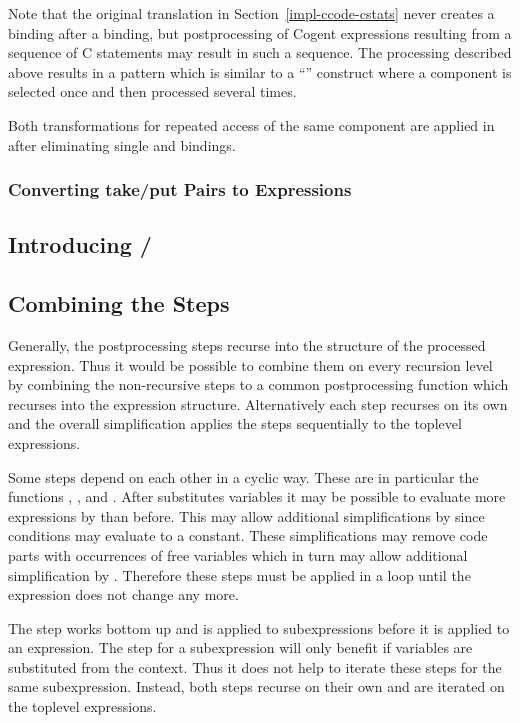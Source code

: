 Note that the original translation in Section~\ref{impl-ccode-cstats} never creates a  binding after a  binding, 
but postprocessing of Cogent expressions resulting from a sequence of C statements may result in such a sequence. The processing
described above results in a pattern which is similar to a ``'' construct where a component is selected once and then
processed several times.

Both transformations for repeated access of the same component are applied in  after eliminating single 
and  bindings.

\subsubsection{Converting take/put Pairs to  Expressions}

\subsection{Introducing /}
\label{impl-post-ref}


\subsection{Combining the Steps}
\label{impl-post-combine}

Generally, the postprocessing steps recurse into the structure of the processed expression. Thus it would be possible to combine them
on every recursion level by combining the non-recursive steps to a common postprocessing function which recurses into the expression
structure. Alternatively each step recurses on its own and the overall simplification applies the steps sequentially to the toplevel
expressions.

Some steps depend on each other in a cyclic way. These are in particular the functions , , and .
After  substitutes variables it may be possible to evaluate more expressions by  than before. This may
allow additional simplifications by  since conditions may evaluate to a constant. These simplifications may remove code parts 
with occurrences of free variables which in turn may allow additional simplification by . Therefore these steps must 
be applied in a loop until the expression does not change any more.

The  step works bottom up and is applied to subexpressions before it is applied to an expression. The  step 
for a subexpression will only benefit if variables are substituted from the context. Thus it does not help to iterate these steps for
the same subexpression. Instead, both steps recurse on their own and are iterated on the toplevel expressions.

